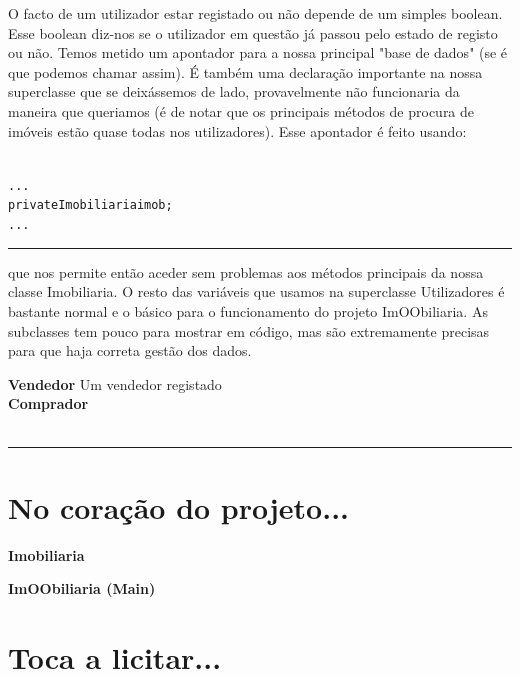 \documentclass[12pt]{article}
\newenvironment{code}                    
{\textbf{
} \hspace{1cm} \hrulefill \\ 
\smallskip 
\begin{center}
\begin{minipage}{0.9\textwidth} 
\begin{alltt}\small}
{\end{alltt}
\end{minipage}
\end{center}
\hrule\smallskip
}
\begin{document}
O facto de um utilizador estar registado ou não depende de um simples boolean.\\ 
Esse boolean diz-nos se o utilizador em questão já passou pelo estado de registo ou não.
\newline
Temos metido um apontador para a nossa principal "base de dados" (se é que podemos chamar assim). 
É também uma declaração importante na nossa superclasse que se deixássemos de lado, provavelmente não funcionaria da maneira que queriamos (é de notar que os principais métodos de procura de imóveis estão quase todas nos utilizadores).
\newline
Esse apontador é feito usando:
~\\
\begin{code}
...
    private Imobiliaria imob;
...
\end{code}
que nos permite então aceder sem problemas aos métodos principais da nossa classe Imobiliaria.
\newline
O resto das variáveis que usamos na superclasse Utilizadores é bastante normal e o básico para o funcionamento do projeto ImOObiliaria.
\newline
As subclasses tem pouco para mostrar em código, mas são extremamente precisas para que haja correta gestão dos dados.
\pagebreak

\textbf{Vendedor}
Um vendedor registado \\

\textbf{Comprador}
\\

\begin{code}

\end{code}


\section{No coração do projeto...}

\textbf{Imobiliaria}



\pagebreak

\textbf{ImOObiliaria (Main)}

\section{Toca a licitar...}
\end{document}

